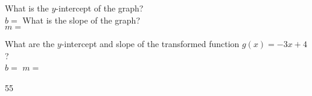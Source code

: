 
\myProblemsWithContent
{What is the $y$-intercept of the graph? \\[0.5\onelineskip] $b = $ }
{What is the slope of the graph?        \\[0.5\onelineskip] $m = $ }

\myWideProblemWithContent
{
    What are the $y$-intercept and slope of the transformed function $g(x) = -3x +4$?
    \\[0.5\onelineskip]
    $b = $  \qquad $m = $ 
    \begin{myTikzpictureGrid}{0.4} {5}{5}
    \end{myTikzpictureGrid}
}